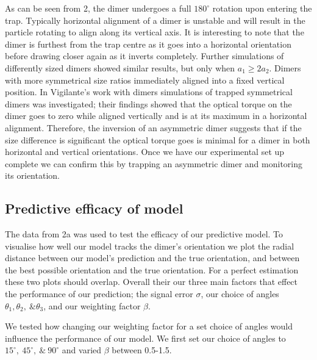 \documentclass[preprint,3p]{elsarticle}
\begin{document}
As can be seen from \figurename{ 2}, the dimer undergoes a full $180^{\circ}$ rotation upon entering the trap. Typically horizontal alignment of a dimer is unstable and will result in the particle rotating to align along its vertical axis. It is interesting to note that the dimer is furthest from the trap centre as it goes into a horizontal orientation before drawing closer again as it inverts completely. Further simulations of differently sized dimers showed similar results, but only when $a_1 \geq 2a_2$. Dimers with more symmetrical size ratios immediately aligned into a fixed vertical position. 
In Vigilante's work with dimers \cite{Vigilante2020Brownian_OT} simulations of trapped symmetrical dimers was investigated; their findings showed that the optical torque on the dimer goes to zero while aligned vertically and is at its maximum in a horizontal alignment. Therefore, the inversion of an asymmetric dimer suggests that if the size difference is significant the optical torque goes is minimal for a dimer in both horizontal and vertical orientations. Once we have our experimental set up complete we can confirm this by trapping an asymmetric dimer and monitoring its orientation. 

\newpage
\subsection{Predictive efficacy of model}
\label{sec:3.2}
The data from \figurename{ 2a} was used to test the efficacy of our predictive model. To visualise how well our model tracks the dimer's orientation we plot the radial distance between our model's prediction and the true orientation, and between the best possible orientation and the true orientation. For a perfect estimation these two plots should overlap. Overall their our three main factors that effect the performance of our prediction; the signal error $\sigma$, our choice of angles $\theta_1, \theta_2, \ \& \theta_3$, and our weighting factor $\beta$. 

We tested how changing our weighting factor for a set choice of angles would influence the performance of our model.  We first set our choice of angles to $15^{\circ}, \ 45^{\circ},\ \& \ 90^{\circ}$ and varied $\beta$ between 0.5-1.5. 
\end{document}
